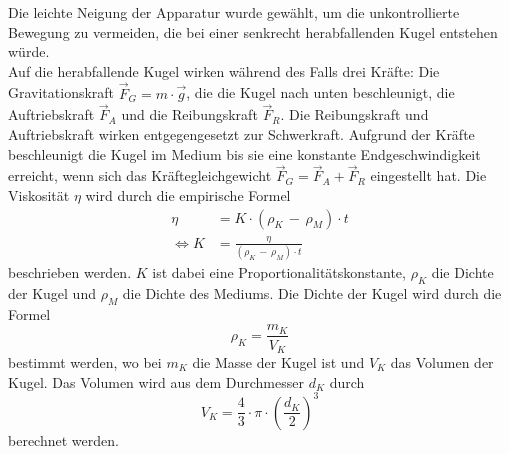             Die leichte Neigung der Apparatur wurde gewählt, um die unkontrollierte Bewegung zu vermeiden, 
            \FloatBarrier die bei einer senkrecht herabfallenden Kugel entstehen würde. \\
            Auf die herabfallende Kugel wirken
            während des Falls drei Kräfte: Die Gravitationskraft $\vec{F}_{G} = m \cdot \vec{g}$, 
            die die Kugel nach unten beschleunigt, die Auftriebskraft $\vec{F}_{A}$ und die 
            Reibungskraft $\vec{F}_{R}$. Die Reibungskraft und Auftriebskraft wirken entgegengesetzt zur Schwerkraft. 
            Aufgrund der Kräfte beschleunigt
            die Kugel im Medium bis sie eine konstante Endgeschwindigkeit erreicht, wenn sich das Kräftegleichgewicht 
            $\vec{F}_{G} = \vec{F}_{A} + \vec{F}_{R}$ eingestellt hat.
            Die Viskosität $\eta$ wird durch die empirische Formel  
            \begin{align}
                \eta &= K \cdot \left( \rho_{K}\,-\,\rho_{M} \right) \cdot t \label{eqn:EmpirischeEtaFunktion} \\
                \Leftrightarrow K &= \frac{\eta}{ \left( \rho_{K}\,-\,\rho_{M} \right) \cdot t }
                \label{eqn:KFunktion}
            \end{align} 
            beschrieben werden. $K$ ist dabei eine Proportionalitätskonstante, $\rho_{K}$ die Dichte der Kugel und $\rho_{M}$
            die Dichte des Mediums. Die Dichte der Kugel wird durch die Formel 
            \begin{equation}
                \rho_{K} = \frac{m_{K}}{V_{K}}
                \label{eqn:DichtefunktionKugel}
            \end{equation}
            bestimmt werden, wo bei $m_{K}$ die Masse der Kugel ist und $V_{K}$ das Volumen der Kugel.
            Das Volumen wird aus dem Durchmesser $d_{K}$ durch
            \begin{equation}
                V_{K} = \frac{4}{3} \cdot \pi \cdot \left( \frac{d_{K}}{2} \right)^3
                \label{eqn:VolumenKugel}
            \end{equation} 
            berechnet werden.
            \FloatBarrier 
    \FloatBarrier
